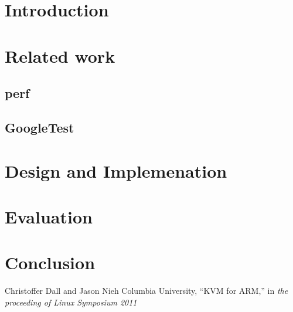 \documentclass[final]{ols}
\begin{document}
\section{Introduction}


\section{Related work}

\subsection{perf}

\subsection{GoogleTest}


\section{Design and Implemenation}

\section{Evaluation}

\section{Conclusion}

\begin{thebibliography}{99}  %
Christoffer Dall and Jason Nieh Columbia University, ``KVM for ARM,'' in \emph{the proceeding of Linux Symposium 2011}
\end{thebibliography}
\end{document}
